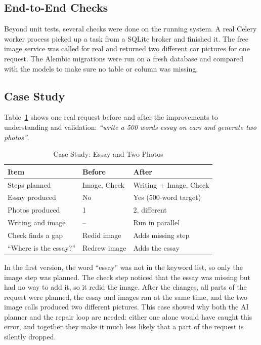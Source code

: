 \documentclass[conference]{IEEEtran}
\begin{document}
\subsection{End-to-End Checks}
Beyond unit tests, several checks were done on the running system. A real Celery worker process picked up
a task from a SQLite broker and finished it. The free image service was called for real and returned two
different car pictures for one request. The Alembic migrations were run on a fresh database and compared
with the models to make sure no table or column was missing.

\subsection{Case Study}
Table~\ref{tab:case} shows one real request before and after the improvements to understanding and
validation: \textit{``write a 500 words essay on cars and generate two photos''}.

\begin{table}[htbp]
\caption{Case Study: Essay and Two Photos}
\begin{center}
\footnotesize
\begin{tabular}{@{}lll@{}}
\toprule
\textbf{Item} & \textbf{Before} & \textbf{After} \\
\midrule
Steps planned & Image, Check & Writing + Image, Check \\
Essay produced & No & Yes (500-word target) \\
Photos produced & 1 & 2, different \\
Writing and image & -- & Run in parallel \\
Check finds a gap & Redid image & Adds missing step \\
``Where is the essay?'' & Redrew image & Adds the essay \\
\bottomrule
\end{tabular}
\label{tab:case}
\end{center}
\end{table}

In the first version, the word ``essay'' was not in the keyword list, so only the image step was planned.
The check step noticed that the essay was missing but had no way to add it, so it redid the image. After
the changes, all parts of the request were planned, the essay and images ran at the same time, and the
two image calls produced two different pictures. This case showed why both the AI planner and the repair
loop are needed: either one alone would have caught this error, and together they make it much less
likely that a part of the request is silently dropped.
\end{document}
